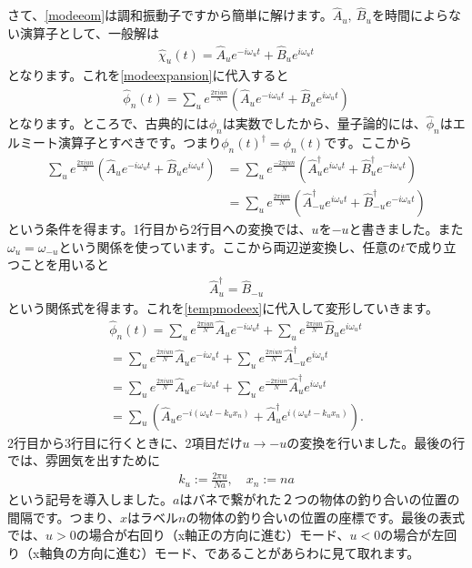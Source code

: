 \documentclass[report,paper=a4, fontsize=12pt, line_length=16cm, number_of_lines=33,dvipdfmx]{jlreq}
\numberwithin{equation}{chapter}
\newcommand{\phih}{\hat{\phi}}
\newcommand{\chih}{\hat{\chi}}
\newcommand{\Ah}{\widehat{A}}
\newcommand{\Bh}{\widehat{B}}
\begin{document}
さて、\eqref{modeeom}は調和振動子ですから簡単に解けます。$\Ah_u,\ \Bh_u$を時間によらない演算子として、一般解は
\begin{align}
  \chih_{u}(t)=\Ah_{u}e^{-i\omega_u t}+\Bh_{u}e^{i\omega_u t}
\end{align}
となります。これを\eqref{modeexpansion}に代入すると
\begin{align}
  \phih_{n}(t)=\sum_{u}e^{\frac{2\pi i u n}{N}}
  (\Ah_{u}e^{-i\omega_u t}+\Bh_{u}e^{i\omega_u t})\label{tempmodeex}
\end{align}
となります。ところで、古典的には$\phi_n$は実数でしたから、量子論的には、$\phih_n$はエルミート演算子とすべきです。つまり$\phi_n(t)^{\dag}=\phi_n(t)$です。ここから
\begin{align}
  \sum_{u}e^{\frac{2\pi i u n}{N}}
  (\Ah_{u}e^{-i\omega_u t}+\Bh_{u}e^{i\omega_u t})
  &=\sum_{u}e^{\frac{-2\pi i u n}{N}}
  (\Ah_{u}^{\dag}e^{i\omega_u t}+\Bh_{u}^{\dag}e^{-i\omega_u t})\nonumber\\
  &=\sum_{u}e^{\frac{2\pi i u n}{N}}(\Ah_{-u}^{\dag}e^{i\omega_u t}+\Bh_{-u}^{\dag}e^{-i\omega_u t})
\end{align}
という条件を得ます。1行目から2行目への変換では、$u$を$-u$と書きました。また$\omega_{u}=\omega_{-u}$という関係を使っています。ここから両辺逆変換し、任意の$t$で成り立つことを用いると
\begin{align}
  \Ah_{u}^{\dag}=\Bh_{-u}
\end{align}
という関係式を得ます。これを\eqref{tempmodeex}に代入して変形していきます。
\begin{align}
  \phih_{n}(t)
  =\sum_{u}e^{\frac{2\pi i u n}{N}}\Ah_{u}e^{-i\omega_u t}+\sum_{u}e^{\frac{2\pi i u n}{N}}\Bh_{u}e^{i\omega_u t}\nonumber\\
  =\sum_{u}e^{\frac{2\pi i u n}{N}}\Ah_{u}e^{-i\omega_u t}+\sum_{u}e^{\frac{2\pi i u n}{N}}\Ah_{-u}^{\dag}e^{i\omega_u t}\nonumber\\
  =\sum_{u}e^{\frac{2\pi i u n}{N}}\Ah_{u}e^{-i\omega_u t}+\sum_{u}e^{\frac{-2\pi i u n}{N}}\Ah_{u}^{\dag}e^{i\omega_u t}\nonumber\\
  =\sum_{u}(\Ah_{u}e^{-i(\omega_u t-k_u x_n)}+\Ah_{u}^{\dag}e^{i(\omega_u t-k_u x_n)}).\label{tempmodeex2}
\end{align}
2行目から3行目に行くときに、2項目だけ$u\to -u$の変換を行いました。最後の行では、雰囲気を出すために
\begin{align}
  k_u:=\frac{2\pi u}{Na},\quad x_n:=na
\end{align}
という記号を導入しました。$a$はバネで繋がれた２つの物体の釣り合いの位置の間隔です。つまり、$x$はラベル$n$の物体の釣り合いの位置の座標です。最後の表式では、$u>0$の場合が右回り（x軸正の方向に進む）モード、$u<0$の場合が左回り（x軸負の方向に進む）モード、であることがあらわに見て取れます。
\end{document}
